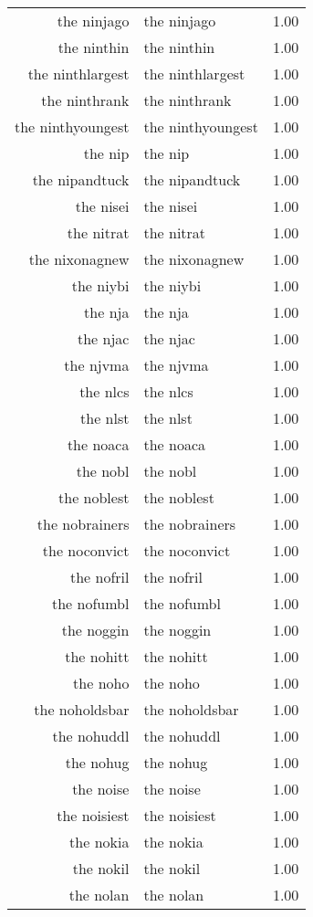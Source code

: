 \begin{table}[ht]
\begin{tabular}{rlr}
  the ninjago & the ninjago & 1.00 \\ 
  the ninthin & the ninthin & 1.00 \\ 
  the ninthlargest & the ninthlargest & 1.00 \\ 
  the ninthrank & the ninthrank & 1.00 \\ 
  the ninthyoungest & the ninthyoungest & 1.00 \\ 
  the nip & the nip & 1.00 \\ 
  the nipandtuck & the nipandtuck & 1.00 \\ 
  the nisei & the nisei & 1.00 \\ 
  the nitrat & the nitrat & 1.00 \\ 
  the nixonagnew & the nixonagnew & 1.00 \\ 
  the niybi & the niybi & 1.00 \\ 
  the nja & the nja & 1.00 \\ 
  the njac & the njac & 1.00 \\ 
  the njvma & the njvma & 1.00 \\ 
  the nlcs & the nlcs & 1.00 \\ 
  the nlst & the nlst & 1.00 \\ 
  the noaca & the noaca & 1.00 \\ 
  the nobl & the nobl & 1.00 \\ 
  the noblest & the noblest & 1.00 \\ 
  the nobrainers & the nobrainers & 1.00 \\ 
  the noconvict & the noconvict & 1.00 \\ 
  the nofril & the nofril & 1.00 \\ 
  the nofumbl & the nofumbl & 1.00 \\ 
  the noggin & the noggin & 1.00 \\ 
  the nohitt & the nohitt & 1.00 \\ 
  the noho & the noho & 1.00 \\ 
  the noholdsbar & the noholdsbar & 1.00 \\ 
  the nohuddl & the nohuddl & 1.00 \\ 
  the nohug & the nohug & 1.00 \\ 
  the noise & the noise & 1.00 \\ 
  the noisiest & the noisiest & 1.00 \\ 
  the nokia & the nokia & 1.00 \\ 
  the nokil & the nokil & 1.00 \\ 
  the nolan & the nolan & 1.00 \\ 

\end{tabular}
\end{table}
